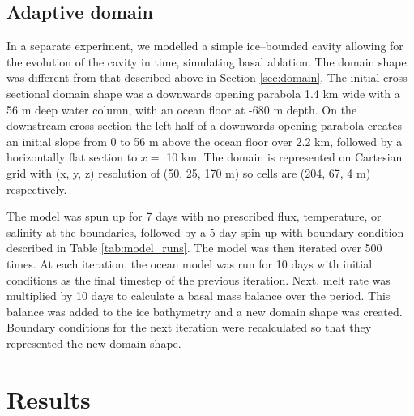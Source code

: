 
\subsection{Adaptive domain} \label{sec:ablation_iterator}

In a separate experiment, we modelled a simple ice--bounded cavity allowing for the evolution of the cavity in time, simulating basal ablation. The domain shape was different from that described above in Section \ref{sec:domain}. The initial cross sectional domain shape was a downwards opening parabola 1.4 km wide with a 56 m deep water column, with an ocean floor at -680 m depth. On the downstream cross section the left half of a downwards opening parabola creates an initial slope from 0 to 56 m above the ocean floor over 2.2 km, followed by a horizontally flat section to $x=$  10 km. The domain is represented on Cartesian grid with (x, y, z) resolution of (50, 25, 170 m) so cells are (204, 67, 4 m) respectively.

The model was spun up for 7 days with no prescribed flux, temperature, or salinity at the boundaries, followed by a 5 day spin up with boundary condition described in Table \ref{tab:model_runs}. The model was then iterated over 500 times. At each iteration, the ocean model was run for 10 days with initial conditions as the final timestep of the previous iteration. Next, melt rate was multiplied by 10 days to calculate a basal mass balance over the period. This balance was added to the ice bathymetry and a new domain shape was created. Boundary conditions for the next iteration were recalculated so that they represented the new domain shape.

\section{Results}


